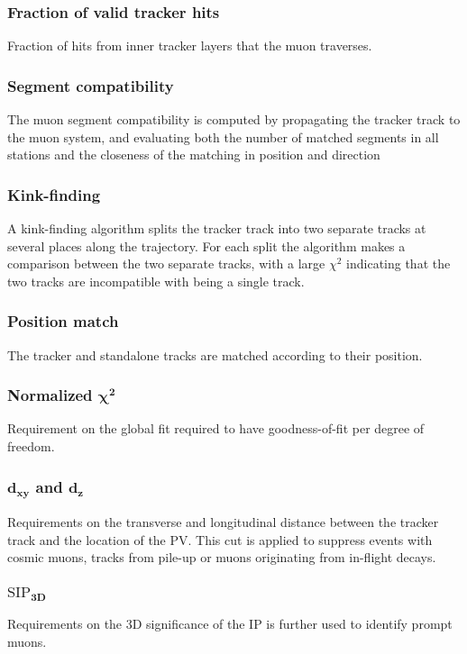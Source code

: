 \subsubsection*{Fraction of valid tracker hits}
\noindent\justify
 Fraction of hits from inner tracker layers that the muon traverses.  
\subsubsection*{Segment compatibility}
\noindent\justify
 The muon segment compatibility is computed by propagating the tracker track to the muon system, and evaluating both the number of matched segments in all stations and the closeness of the matching in position and direction     
\subsubsection*{Kink-finding}
\noindent\justify
A kink-finding algorithm splits the tracker track into two separate tracks at several places along the trajectory.
For each split the algorithm makes a comparison between the two separate tracks, with a large $\chi^{2}$ indicating that the two tracks are incompatible with being a single track.
\subsubsection*{Position match} 
\noindent\justify
The tracker and standalone tracks are matched according to their position. 
\subsubsection*{Normalized $\bm{\chi^{2}}$}
\noindent\justify
Requirement on the global fit required to have goodness-of-fit per degree of freedom. 
\subsubsection*{$\bm{d_{xy}}$ and $\bm{d_{z}}$}
\noindent\justify
Requirements on the transverse and longitudinal distance between the tracker track and the location of the PV. 
This cut is applied to suppress events with cosmic muons, tracks from pile-up or muons originating from in-flight decays.
\subsubsection*{$\bm{\mathrm{SIP}_{3D}}$}
\noindent\justify
Requirements on the 3D significance of the IP is further used to identify prompt muons.  
